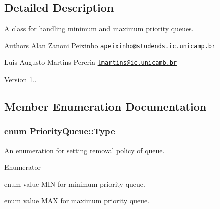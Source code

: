 \subsection{Detailed Description}
A class for handling minimum and maximum priority queues. 

\begin{DoxyAuthor}{Authors}
Alan Zanoni Peixinho \href{mailto:apeixinho@studends.ic.unicamp.br}{\tt apeixinho@studends.\+ic.\+unicamp.\+br} 

Luis Augusto Martins Pereria \href{mailto:lmartins@ic.unicamb.br}{\tt lmartins@ic.\+unicamb.\+br} 
\end{DoxyAuthor}
\begin{DoxyVersion}{Version}
1.. 
\end{DoxyVersion}


\subsection{Member Enumeration Documentation}
\hypertarget{classPriorityQueue_a5d63bb7f1eeef31a80cdff9f280f081a}{
\subsubsection[{Type}]{\setlength{\rightskip}{0pt plus 5cm}enum {\bf Priority\+Queue\+::\+Type}}}\label{classPriorityQueue_a5d63bb7f1eeef31a80cdff9f280f081a}


An enumeration for setting removal policy of queue. 

\begin{Desc}
\item[Enumerator]\par
\begin{description}
\item[{\em 
\hypertarget{classPriorityQueue_a5d63bb7f1eeef31a80cdff9f280f081aa594ee8d58305ad3ccb1f987007a1cb19}{M\+I\+N}\label{classPriorityQueue_a5d63bb7f1eeef31a80cdff9f280f081aa594ee8d58305ad3ccb1f987007a1cb19}
}]enum value M\+I\+N for minimum priority queue. \item[{\em 
\hypertarget{classPriorityQueue_a5d63bb7f1eeef31a80cdff9f280f081aa427d161a5bb6967ec6d39a669f852c5d}{M\+A\+X}\label{classPriorityQueue_a5d63bb7f1eeef31a80cdff9f280f081aa427d161a5bb6967ec6d39a669f852c5d}
}]enum value M\+A\+X for maximum priority queue. \end{description}
\end{Desc}


